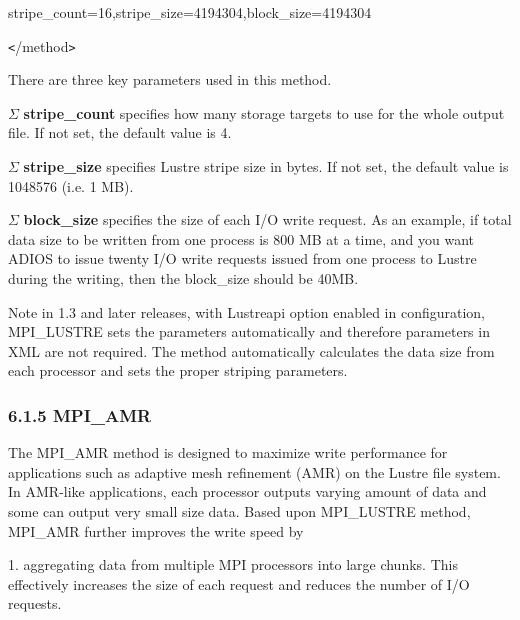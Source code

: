 \vspace{10pt}
\parindent=14pt
stripe\_count=16,stripe\_size=4194304,block\_size=4194304

\vspace{10pt}
\parindent=0pt
\texttt{<}/method\texttt{>}

\vspace{22pt}
There are three key parameters used in this method.

\vspace{10pt}
\ensuremath{\Sigma} \textbf{stripe\_count} specifies how many storage targets to 
use for the whole output file. If not set, the default value is 4.

\vspace{10pt}
\ensuremath{\Sigma} \textbf{stripe\_size}  specifies Lustre stripe size in bytes. 
If not set, the default value is 1048576 (i.e. 1 MB).

\vspace{10pt}
\ensuremath{\Sigma} \textbf{block\_size}   specifies the size of each I/O write 
request. As an example, if total data size to be written from one process is 800 
MB at a time, and you want ADIOS to issue twenty I/O write requests issued from 
one process to Lustre during the writing, then the block\_size should be 40MB.

\vspace{22pt}
Note in 1.3 and later releases, with Lustreapi option enabled in configuration, 
MPI\_LUSTRE sets the parameters automatically and therefore parameters in XML are 
not required.  The method automatically calculates the data size from each processor 
and sets the proper striping parameters. \label{HRef278374093}\label{HToc182553385}

\vspace{22pt}
\subsubsection*{{\large \textbf{6.1.5 MPI\_AMR}}}

\vspace{10pt}
The MPI\_AMR method is designed to maximize write performance for applications 
such as adaptive mesh refinement (AMR) on the Lustre file system. In AMR-like applications, 
each processor outputs varying amount of data and some can output very small size 
data. Based upon MPI\_LUSTRE method, MPI\_AMR further improves the write speed 
by 

\vspace{22pt}
1. aggregating data from multiple MPI processors into large chunks. This effectively 
increases the size of each request and reduces the number of I/O requests.

